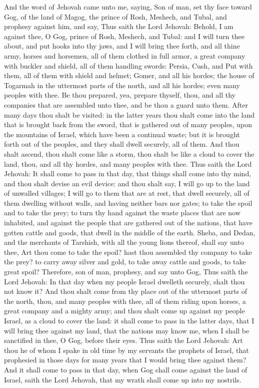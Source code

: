 And the word of Jehovah came unto me, saying, Son of man, set thy face toward Gog, of the land of Magog, the prince of Rosh, Meshech, and Tubal, and prophesy against him, and say, Thus saith the Lord Jehovah: Behold, I am against thee, O Gog, prince of Rosh, Meshech, and Tubal: and I will turn thee about, and put hooks into thy jaws, and I will bring thee forth, and all thine army, horses and horsemen, all of them clothed in full armor, a great company with buckler and shield, all of them handling swords: Persia, Cush, and Put with them, all of them with shield and helmet; Gomer, and all his hordes; the house of Togarmah in the uttermost parts of the north, and all his hordes; even many peoples with thee.  Be thou prepared, yea, prepare thyself, thou, and all thy companies that are assembled unto thee, and be thou a guard unto them. After many days thou shalt be visited: in the latter years thou shalt come into the land that is brought back from the sword, that is gathered out of many peoples, upon the mountains of Israel, which have been a continual waste; but it is brought forth out of the peoples, and they shall dwell securely, all of them. And thou shalt ascend, thou shalt come like a storm, thou shalt be like a cloud to cover the land, thou, and all thy hordes, and many peoples with thee.  Thus saith the Lord Jehovah: It shall come to pass in that day, that things shall come into thy mind, and thou shalt devise an evil device: and thou shalt say, I will go up to the land of unwalled villages; I will go to them that are at rest, that dwell securely, all of them dwelling without walls, and having neither bars nor gates; to take the spoil and to take the prey; to turn thy hand against the waste places that are now inhabited, and against the people that are gathered out of the nations, that have gotten cattle and goods, that dwell in the middle of the earth. Sheba, and Dedan, and the merchants of Tarshish, with all the young lions thereof, shall say unto thee, Art thou come to take the spoil? hast thou assembled thy company to take the prey? to carry away silver and gold, to take away cattle and goods, to take great spoil?  Therefore, son of man, prophesy, and say unto Gog, Thus saith the Lord Jehovah: In that day when my people Israel dwelleth securely, shalt thou not know it? And thou shalt come from thy place out of the uttermost parts of the north, thou, and many peoples with thee, all of them riding upon horses, a great company and a mighty army; and thou shalt come up against my people Israel, as a cloud to cover the land: it shall come to pass in the latter days, that I will bring thee against my land, that the nations may know me, when I shall be sanctified in thee, O Gog, before their eyes.  Thus saith the Lord Jehovah: Art thou he of whom I spake in old time by my servants the prophets of Israel, that prophesied in those days for many years that I would bring thee against them? And it shall come to pass in that day, when Gog shall come against the land of Israel, saith the Lord Jehovah, that my wrath shall come up into my nostrils. 